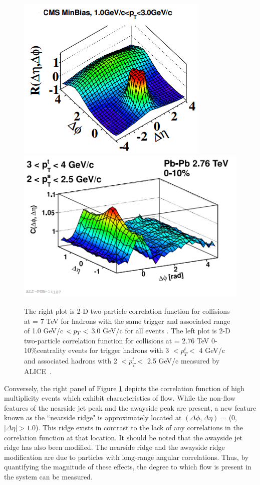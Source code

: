 \begin{figure}[!ht]
\begin{center}
\includegraphics[width=0.43\linewidth]{figs/pp_correlation_function_min_bias.png}
\includegraphics[width=0.48\linewidth]{figs/pbpb_correlation_function_010.png}
\caption{The right plot is 2-D two-particle correlation function for \pp collisions at \sqsn = 7 TeV for hadrons with the same trigger and associated \pt range of 1.0 GeV/c $< \mbox{$p_T$} <$ 3.0 GeV/c for all events \cite{Khachatryan2010}. The left plot is 2-D two-particle correlation function for \pbpb collisions at \sqsn = 2.76 TeV 0-10\%centrality events for trigger hadrons with 3 $<p_T^t<$ 4 GeV/c and associated hadrons with 2 $<p_T^t<$ 2.5 GeV/c measured by ALICE~\cite{Khachatryan2010}.}
\label{fig:corr_function_example}
\end{center}
\end{figure}

Conversely, the right panel of Figure \ref{fig:corr_function_example} depicts the correlation function of high multiplicity \pbpb events which exhibit characteristics of flow. 
While the non-flow features of the nearside jet peak and the awayside peak are present, a new feature known as the ``nearside ridge" is approximately located at $(\Delta\phi,\Delta\eta)$ = (0,$|\Delta\eta|> 1.0$). This ridge exists in contrast to the lack of any correlations in the \pp correlation function at that location. It should be noted that the awayside jet ridge has also been modified. The nearside ridge and the awayside ridge modification are due to particles with long-range angular correlations. Thus, by quantifying the magnitude of these effects, the degree to which flow is present in the system can be measured.


